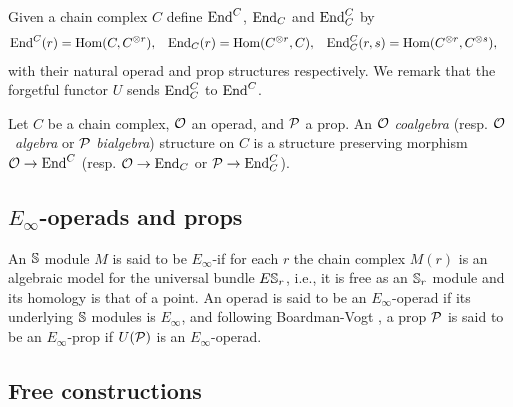 Given a chain complex $C$ define $\End^C$, $\End_C$ and $\End_C^C$ by
\begin{align*}
\End^C(r) &= \Hom(C, C^{\otimes r}),
& \End_C(r) &= \Hom(C^{\otimes r}, C),
& \End^C_C(r, s) &= \Hom(C^{\otimes r}, C^{\otimes s}),
\end{align*}
with their natural operad and prop structures respectively.
We remark that the forgetful functor $U$ sends $\End^C_C$ to $\End^C$.

Let $C$ be a chain complex, $\O$ an operad, and $\P$ a prop.
An $\O$ \textit{coalgebra} (resp. \mbox{$\O$ \textit{algebra}} or $\P$ \textit{bialgebra}) structure on $C$ is a structure preserving morphism $\O \to \End^C$ (resp. $\O \to \End_C$ or $\P \to \End_C^C$).

\subsection{$E_\infty$-operads and props}

An $\S$ module $M$ is said to be $E_\infty$-if for each $r$ the chain complex $M(r)$ is an algebraic model for the universal bundle $E\S_r$, i.e., it is free as an $\S_r$ module and its homology is that of a point.
An operad is said to be an $E_\infty$-operad if its underlying $\S$ modules is $E_\infty$, and following Boardman-Vogt \cite{boardman2006homotopy}, a prop $\P$ is said to be an $E_\infty$-prop if $U(\P)$ is an $E_\infty$-operad.

\subsection{Free constructions}


